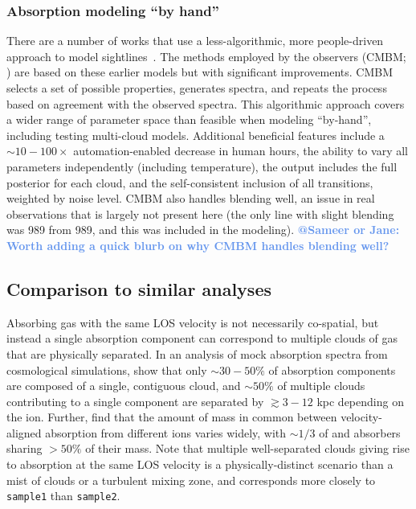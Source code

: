 \documentclass[fleqn,usenatbib]{mnras}
\makeatletter
\newcommand{\atsameer}[1]{\textcolor{CornflowerBlue}{\textbf{@Sameer or Jane: #1}}}
\makeatother
\begin{document}
\subsubsection{Absorption modeling ``by hand''}

There are a number of works that use a less-algorithmic, more people-driven approach to model sightlines~\citep[e.g.][]{churchill1999multiple, charlton2000anticipating, charlton2003high, ding2003quadruple, ding2003multiphase, ding2005absorption, zonak2004absorption, masiero2005models, lynch2007physical, misawa2008supersolar, lacki2010z, jones2010bare, muzahid2015Extreme, richter2018New, rosenwasser2018understanding, norris2021Discovery}.
The methods employed by the observers (CMBM; \citealt{sameer2021Cloudbycloud, sameer2022Probing}) are based on these earlier models but with significant improvements.
CMBM selects a set of possible properties, generates spectra, and repeats the process based on agreement with the observed spectra.
This algorithmic approach covers a wider range of parameter space than feasible when modeling ``by-hand'', including testing multi-cloud models.
Additional beneficial features include
a $\sim 10-100 \times$ automation-enabled decrease in human hours,
the ability to vary all parameters independently (including temperature),
the output includes the full posterior for each cloud,
and the self-consistent inclusion of all transitions, weighted by noise level.
CMBM also handles blending well, an issue in real observations that is largely not present here
(the only line with slight blending was  989 from  989, and this was included in the modeling).
\atsameer{Worth adding a quick blurb on why CMBM handles blending well?}

\subsection{Comparison to similar analyses}

Absorbing gas with the same LOS velocity is not necessarily co-spatial, but instead a single absorption component can correspond to multiple clouds of gas that are physically separated.
In an analysis of mock absorption spectra from cosmological simulations, \cite{marra2022Examining} show that only $\sim 30-50\%$ of absorption components are composed of a single, contiguous cloud, and $\sim 50\%$ of multiple clouds contributing to a single component are separated by $\gtrsim 3-12$ kpc depending on the ion.
Further, \cite{marra2022Examining} find that the amount of mass in common between velocity-aligned absorption from different ions varies widely, with $\sim 1/3$ of  and  absorbers sharing $>50\%$ of their mass.
Note that multiple well-separated clouds giving rise to absorption at the same LOS velocity is a physically-distinct scenario than a mist of clouds or a turbulent mixing zone, and corresponds more closely to \texttt{sample1} than \texttt{sample2}.
\end{document}
